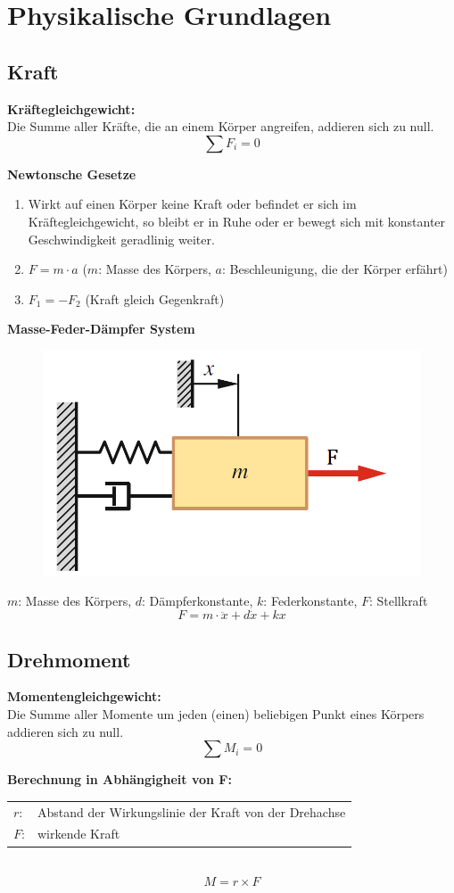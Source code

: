 \documentclass[10pt,a4paper]{article}
\renewcommand{\arraystretch}{1.5}
\newcommand{\tab}[1][1]{\hspace*{#1cm}}
\begin{document}
\renewcommand{\arraystretch}{1}
\section{Physikalische Grundlagen}
\subsection{Kraft}
\textbf{Kräftegleichgewicht:} \\
Die Summe aller Kräfte, die an einem Körper angreifen, addieren sich zu null.
$$
	\sum F_i = 0
$$

\textbf{Newtonsche Gesetze}
\begin{enumerate}
	\item Wirkt auf einen Körper keine Kraft oder befindet er sich im Kräftegleichgewicht, so bleibt er in Ruhe oder er bewegt sich mit konstanter Geschwindigkeit geradlinig weiter.
	\item $F = m ⋅ a$ \tab[2] ($m$: Masse des Körpers, $a$: Beschleunigung, die der Körper erfährt)
	\item $F_1 = -F_2$ \tab[2] (Kraft gleich Gegenkraft)
\end{enumerate}

\textbf{Masse-Feder-Dämpfer System}
\begin{figure}[H]
	\includegraphics[width=0.5\columnwidth]{imgs/mass-spring-damper.png}
\end{figure}
$m$: Masse des Körpers, $d$: Dämpferkonstante, $k$: Federkonstante, $F$: Stellkraft
$$
	F = m ⋅ \ddot x + d \dot x + k x
$$


\subsection{Drehmoment}
\textbf{Momentengleichgewicht:} \\
Die Summe aller Momente um jeden (einen) beliebigen Punkt eines Körpers addieren sich zu null.
$$
	\sum M_i = 0
$$

\textbf{Berechnung in Abhängigheit von F:} \\
\begin{tabularx}{\columnwidth}{lX}
	$r$: & Abstand der Wirkungslinie der Kraft von der Drehachse \\
	$F$: & wirkende Kraft
\end{tabularx} \\
$$
	M = r \times F
$$
\end{document}
